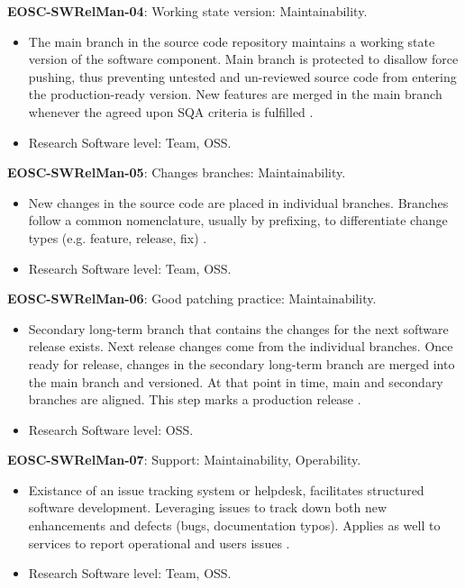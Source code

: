 \textbf{EOSC-SWRelMan-04}: Working state version: Maintainability.

\begin{itemize}
    \item The main branch in the source code repository maintains a working state version of the software component. Main branch is protected to disallow force pushing, thus preventing untested and un-reviewed source code from entering the production-ready version. New features are merged in the main branch whenever the agreed upon SQA criteria is fulfilled \cite{orviz_set_2017}.
    \item Research Software level: Team, OSS.
\end{itemize}

\textbf{EOSC-SWRelMan-05}: Changes branches: Maintainability.

\begin{itemize}
    \item New changes in the source code are placed in individual branches. Branches follow a common nomenclature, usually by prefixing, to differentiate change types (e.g. feature, release, fix) \cite{orviz_set_2017}.
    \item Research Software level: Team, OSS.
\end{itemize}

\textbf{EOSC-SWRelMan-06}: Good patching practice: Maintainability.

\begin{itemize}
    \item Secondary long-term branch that contains the changes for the next software release exists. Next release changes come from the individual branches. Once ready for release, changes in the secondary long-term branch are merged into the main branch and versioned. At that point in time, main and secondary branches are aligned. This step marks a production release \cite{orviz_set_2017,raymond_software_2013}.
    \item Research Software level: OSS.
\end{itemize}

\textbf{EOSC-SWRelMan-07}: Support: Maintainability, Operability.

\begin{itemize}
    \item Existance of an issue tracking system or helpdesk, facilitates structured software development. Leveraging issues to track down both new enhancements and defects (bugs, documentation typos). Applies as well to services to report operational and users issues \cite{srisopha_software_2018,shepherdson_cessda_2019,orviz_set_2017,orviz_fernandez_eosc-synergy_2020}.
    \item Research Software level: Team, OSS.
\end{itemize}

